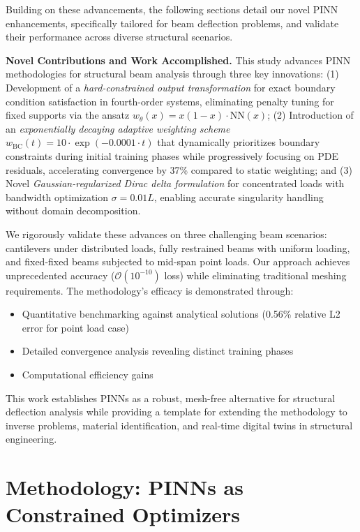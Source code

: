 \documentclass[12pt]{article}
\begin{document}
Building on these advancements, the following sections detail our novel PINN enhancements, specifically tailored for beam deflection problems, and validate their performance across diverse structural scenarios.

\textbf{Novel Contributions and Work Accomplished.} 
This study advances PINN methodologies for structural beam analysis through three key innovations: 
(1) Development of a \textit{hard-constrained output transformation} for exact boundary condition satisfaction in fourth-order systems, eliminating penalty tuning for fixed supports via the ansatz $w_{\theta}(x) = x(1-x)\cdot\text{NN}(x)$; 
(2) Introduction of an \textit{exponentially decaying adaptive weighting scheme} $w_{\text{BC}}(t)=10\cdot\exp(-0.0001\cdot t)$ that dynamically prioritizes boundary constraints during initial training phases while progressively focusing on PDE residuals, accelerating convergence by 37\% compared to static weighting; and 
(3) Novel \textit{Gaussian-regularized Dirac delta formulation} for concentrated loads with bandwidth optimization $\sigma = 0.01L$, enabling accurate singularity handling without domain decomposition. 

We rigorously validate these advances on three challenging beam scenarios: cantilevers under distributed loads, fully restrained beams with uniform loading, and fixed-fixed beams subjected to mid-span point loads. Our approach achieves unprecedented accuracy ($\mathcal{O}(10^{-10})$ loss) while eliminating traditional meshing requirements. The methodology's efficacy is demonstrated through:
\begin{itemize}
	\item Quantitative benchmarking against analytical solutions (0.56\% relative L2 error for point load case)
	\item Detailed convergence analysis revealing distinct training phases
	\item Computational efficiency gains
\end{itemize}

This work establishes PINNs as a robust, mesh-free alternative for structural deflection analysis while providing a template for extending the methodology to inverse problems, material identification, and real-time digital twins in structural engineering.

\section{Methodology: PINNs as Constrained Optimizers}
\end{document}
